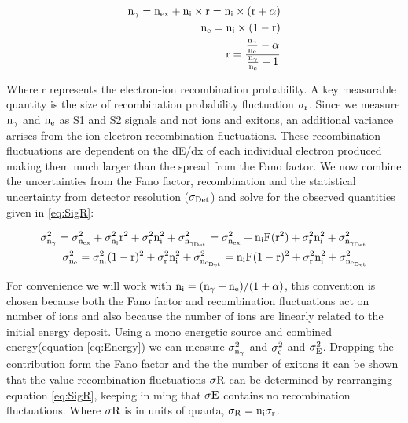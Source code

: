 \begin{equation}
\begin{split}
\rm  n_\gamma = n_{ex} + n_i\times r = n_i\times (r+\alpha) \\
\rm  n_e = n_i\times (1-r)\\
\rm r= \frac{\frac{n_\gamma}{n_e}-\alpha}{\frac{n_\gamma}{n_e} + 1}
\label{eq:Quanta}
\end{split}
\end{equation}

Where r represents the electron-ion recombination probability. A key measurable quantity is the size of recombination probability fluctuation $\rm \sigma_r$. Since we measure $\rm n_\gamma$ and $\rm n_e$ as S1 and S2 signals and not ions and exitons, an additional variance arrises from the ion-electron recombination fluctuations. These recombination fluctuations are dependent on the dE/dx of each individual electron produced making them much larger than the spread from the Fano factor. We now combine the uncertainties from the Fano factor, recombination and the statistical uncertainty from detector resolution ($\rm\sigma_{Det}$) and solve for the observed quantities given in \ref{eq:SigR}:

\begin{equation}
\begin{split}
\rm \sigma_{n_\gamma}^2  =\sigma_{n_{ex}}^2 + \sigma_{n_i}^2 r^2 +  \sigma_{r}^2 n_i^2 +\sigma_{n_{\gamma_{Det}}}^2 = \sigma_{n_{ex}}^2 + n_iF(r^2) + \sigma_{r}^2 n_i^2 + \sigma_{n_{\gamma_{Det}}}^2 \\
\rm \sigma_{n_e}^2  = \sigma_{n_i}^2 (1-r)^2 +  \sigma_{r}^2 n_i^2 +\sigma_{n_{e_{Det}}}^2= n_iF(1-r)^2+ \sigma_{r}^2 n_i^2 +\sigma_{n_{e_{Det}}}^2
\label{eq:SigR}
\end{split}
\end{equation}


For convenience we will work with $\rm n_i = (\rm n_\gamma + n_e)/(1+\alpha)$, this convention is chosen because both the Fano factor and recombination fluctuations act on number of ions and also because the number of ions are linearly related to the initial energy deposit. Using a mono energetic source and combined energy(equation \ref{eq:Energy}) we can measure $\rm \sigma_{n_\gamma}^2$ and $\rm \sigma_{e}^2$ and $\rm \sigma_{E}^2$. Dropping the contribution form the Fano factor and the the number of exitons it can be shown that the value recombination fluctuations $\rm \sigma R$ can be determined by rearranging equation \ref{eq:SigR}, keeping in ming that $\rm \sigma E$ contains no recombination fluctuations. Where $\rm \sigma R$ is in units of quanta, $\rm \sigma_R = n_i\sigma_r$.


